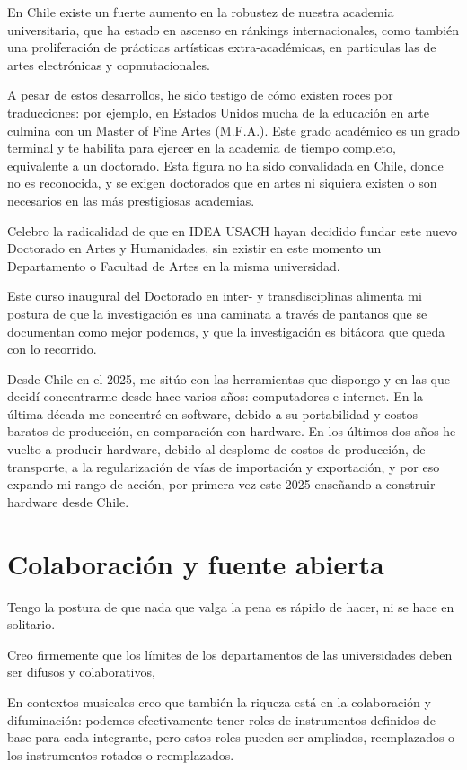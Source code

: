 \documentclass{article}
\begin{document}
En Chile existe un fuerte aumento en la robustez de nuestra academia universitaria, que ha estado en ascenso en ránkings internacionales, como también una proliferación de prácticas artísticas extra-académicas, en particulas las de artes electrónicas y copmutacionales.

A pesar de estos desarrollos, he sido testigo de cómo existen roces por traducciones: por ejemplo, en Estados Unidos mucha de la educación en arte culmina con un Master of Fine Artes (M.F.A.). Este grado académico es un grado terminal y te habilita para ejercer en la academia de tiempo completo, equivalente a un doctorado. Esta figura no ha sido convalidada en Chile, donde no es reconocida, y se exigen doctorados que en artes ni siquiera existen o son necesarios en las más prestigiosas academias.

Celebro la radicalidad de que en IDEA USACH hayan decidido fundar este nuevo Doctorado en Artes y Humanidades, sin existir en este momento un Departamento o Facultad de Artes en la misma universidad.

Este curso inaugural del Doctorado en inter- y transdisciplinas alimenta mi postura de que la investigación es una caminata a través de pantanos que se documentan como mejor podemos, y que la investigación es bitácora que queda con lo recorrido.

Desde Chile en el 2025, me sitúo con las herramientas que dispongo y en las que decidí concentrarme desde hace varios años: computadores e internet. En la última década me concentré en software, debido a su portabilidad y costos baratos de producción, en comparación con hardware. En los últimos dos años he vuelto a producir hardware, debido al desplome de costos de producción, de transporte, a la regularización de vías de importación y exportación, y por eso expando mi rango de acción, por primera vez este 2025 enseñando a construir hardware desde Chile.

\clearpage

\section{Colaboración y fuente abierta}

Tengo la postura de que nada que valga la pena es rápido de hacer, ni se hace en solitario.

Creo firmemente que los límites de los departamentos de las universidades deben ser difusos y colaborativos,

En contextos musicales creo que también la riqueza está en la colaboración y difuminación: podemos efectivamente tener roles de instrumentos definidos de base para cada integrante, pero estos roles pueden ser ampliados, reemplazados o los instrumentos rotados o reemplazados.
\end{document}
